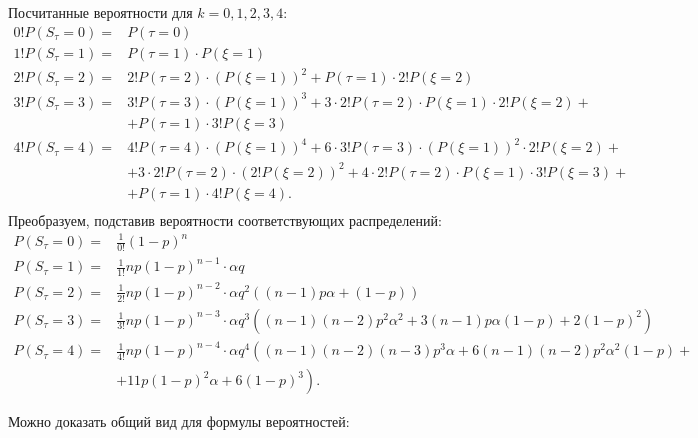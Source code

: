 \documentclass[12pt, specialist, subf, substylefile = spbu.rtx]{disser}
\begin{document}
	Посчитанные вероятности для $ k = 0, 1, 2, 3, 4 $:
	\[ 
	\begin{aligned}
		0! P(S _\tau = 0) =& P(\tau = 0)\\
		1! P(S _\tau = 1) =& P(\tau = 1) \cdot P(\xi = 1)\\
		2! P(S _\tau = 2) =& 2! P(\tau = 2) \cdot \left(P(\xi = 1)\right) ^2 + P(\tau = 1) \cdot 2!P(\xi = 2)\\
		3! P(S _\tau = 3) =& 3! P(\tau = 3) \cdot \left(P(\xi = 1)\right) ^3 + 3 \cdot 2!P(\tau = 2) \cdot P(\xi = 1) \cdot 2! P(\xi = 2) +\\
		&+ P(\tau = 1) \cdot 3!P(\xi = 3)\\
		4! P(S _\tau = 4) =& 4! P(\tau = 4) \cdot \left(P(\xi = 1)\right) ^4 + 6 \cdot 3! P(\tau = 3) \cdot \left(P(\xi = 1)\right) ^2 \cdot 2! P(\xi = 2) + \\
		&+ 3 \cdot 2! P(\tau = 2) \cdot \left(2! P(\xi = 2)\right) ^2 + 4 \cdot 2! P(\tau = 2) \cdot P(\xi = 1) \cdot 3! P(\xi = 3) +\\
		&+ P(\tau = 1) \cdot 4! P(\xi = 4).\\
	\end{aligned}
	\]
	Преобразуем, подставив вероятности соответствующих распределений:
	\[ 
	\begin{aligned}
		P(S _\tau = 0) =& \frac 1 {0!} (1 - p) ^n\\
		P(S _\tau = 1) =& \frac 1 {1!} n p (1 - p) ^{n - 1} \cdot \alpha q\\
		P(S _\tau = 2) =& \frac 1 {2!} n p (1 - p) ^{n - 2} \cdot \alpha q ^2 \left( (n - 1) p \alpha + (1 - p) \right)\\
		P(S _\tau = 3) =& \frac 1 {3!} n p (1 - p) ^{n - 3} \cdot \alpha q ^3 \left( (n - 1)(n - 2) p ^2 \alpha ^2 + 3 (n - 1) p \alpha (1 - p) + 2 (1 - p) ^2 \right)\\
		P(S _\tau = 4) =& \frac 1 {4!} n p (1 - p) ^{n - 4} \cdot \alpha q ^4 \left( (n - 1)(n - 2)(n - 3) p ^3 \alpha + 6 (n - 1)(n - 2) p ^2 \alpha ^2 (1 - p) +\right.\\
		&\left.+ 11 p (1 - p) ^2 \alpha + 6 (1 - p) ^3 \right).
	\end{aligned}
	\]
	
	Можно доказать общий вид для формулы вероятностей:
	
\end{document}
